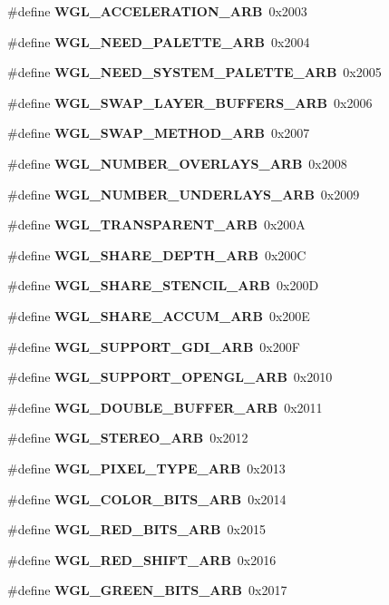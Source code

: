 \begin{DoxyCompactItemize}
\#define {\bf W\+G\+L\+\_\+\+A\+C\+C\+E\+L\+E\+R\+A\+T\+I\+O\+N\+\_\+\+A\+RB}~0x2003
\item 
\#define {\bf W\+G\+L\+\_\+\+N\+E\+E\+D\+\_\+\+P\+A\+L\+E\+T\+T\+E\+\_\+\+A\+RB}~0x2004
\item 
\#define {\bf W\+G\+L\+\_\+\+N\+E\+E\+D\+\_\+\+S\+Y\+S\+T\+E\+M\+\_\+\+P\+A\+L\+E\+T\+T\+E\+\_\+\+A\+RB}~0x2005
\item 
\#define {\bf W\+G\+L\+\_\+\+S\+W\+A\+P\+\_\+\+L\+A\+Y\+E\+R\+\_\+\+B\+U\+F\+F\+E\+R\+S\+\_\+\+A\+RB}~0x2006
\item 
\#define {\bf W\+G\+L\+\_\+\+S\+W\+A\+P\+\_\+\+M\+E\+T\+H\+O\+D\+\_\+\+A\+RB}~0x2007
\item 
\#define {\bf W\+G\+L\+\_\+\+N\+U\+M\+B\+E\+R\+\_\+\+O\+V\+E\+R\+L\+A\+Y\+S\+\_\+\+A\+RB}~0x2008
\item 
\#define {\bf W\+G\+L\+\_\+\+N\+U\+M\+B\+E\+R\+\_\+\+U\+N\+D\+E\+R\+L\+A\+Y\+S\+\_\+\+A\+RB}~0x2009
\item 
\#define {\bf W\+G\+L\+\_\+\+T\+R\+A\+N\+S\+P\+A\+R\+E\+N\+T\+\_\+\+A\+RB}~0x200A
\item 
\#define {\bf W\+G\+L\+\_\+\+S\+H\+A\+R\+E\+\_\+\+D\+E\+P\+T\+H\+\_\+\+A\+RB}~0x200C
\item 
\#define {\bf W\+G\+L\+\_\+\+S\+H\+A\+R\+E\+\_\+\+S\+T\+E\+N\+C\+I\+L\+\_\+\+A\+RB}~0x200D
\item 
\#define {\bf W\+G\+L\+\_\+\+S\+H\+A\+R\+E\+\_\+\+A\+C\+C\+U\+M\+\_\+\+A\+RB}~0x200E
\item 
\#define {\bf W\+G\+L\+\_\+\+S\+U\+P\+P\+O\+R\+T\+\_\+\+G\+D\+I\+\_\+\+A\+RB}~0x200F
\item 
\#define {\bf W\+G\+L\+\_\+\+S\+U\+P\+P\+O\+R\+T\+\_\+\+O\+P\+E\+N\+G\+L\+\_\+\+A\+RB}~0x2010
\item 
\#define {\bf W\+G\+L\+\_\+\+D\+O\+U\+B\+L\+E\+\_\+\+B\+U\+F\+F\+E\+R\+\_\+\+A\+RB}~0x2011
\item 
\#define {\bf W\+G\+L\+\_\+\+S\+T\+E\+R\+E\+O\+\_\+\+A\+RB}~0x2012
\item 
\#define {\bf W\+G\+L\+\_\+\+P\+I\+X\+E\+L\+\_\+\+T\+Y\+P\+E\+\_\+\+A\+RB}~0x2013
\item 
\#define {\bf W\+G\+L\+\_\+\+C\+O\+L\+O\+R\+\_\+\+B\+I\+T\+S\+\_\+\+A\+RB}~0x2014
\item 
\#define {\bf W\+G\+L\+\_\+\+R\+E\+D\+\_\+\+B\+I\+T\+S\+\_\+\+A\+RB}~0x2015
\item 
\#define {\bf W\+G\+L\+\_\+\+R\+E\+D\+\_\+\+S\+H\+I\+F\+T\+\_\+\+A\+RB}~0x2016
\item 
\#define {\bf W\+G\+L\+\_\+\+G\+R\+E\+E\+N\+\_\+\+B\+I\+T\+S\+\_\+\+A\+RB}~0x2017

\end{DoxyCompactItemize}
